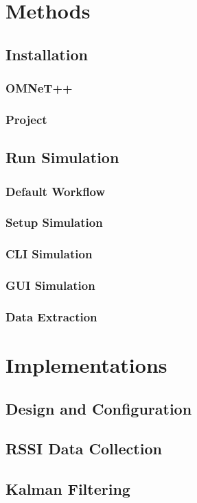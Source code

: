 \documentclass[a4paper, 11pt]{article}
\begin{document}
\section{Methods}

\subsection{Installation}
\subsubsection{OMNeT++}
\subsubsection{Project}

\subsection{Run Simulation}
\subsubsection{Default Workflow}
\subsubsection{Setup Simulation}
\subsubsection{CLI Simulation}
\subsubsection{GUI Simulation}
\subsubsection{Data Extraction}

\section{Implementations}
\subsection{Design and Configuration}
\subsection{RSSI Data Collection}
\subsection{Kalman Filtering}
\subsection{}

\newpage
{} 
{}
\renewcommand\bibname{References} 
\begin{spacing}{1.25} 


\end{spacing}
\end{document}
